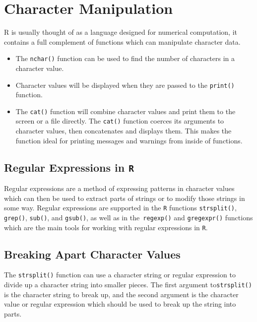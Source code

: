 \section{Character Manipulation}
R is usually thought of as a language designed for numerical computation,
it contains a full complement of functions which can manipulate character
data.

\begin{itemize}
\item The \texttt{nchar()} function can be used to find the number of characters in a character value.
\item Character values will be displayed when they are passed to the  \texttt{print()} function.
\item The \texttt{cat()}  function will combine
character values and print them to the screen or a file directly. The \texttt{cat()}
function coerces its arguments to character values, then concatenates and displays
them. This makes the function ideal for printing messages and warnings
from inside of functions.
\end{itemize}

\subsection{Regular Expressions in \texttt{R}}
Regular expressions are a method of expressing patterns in character values
which can then be used to extract parts of strings or to modify those strings in some way. Regular expressions are supported in the \texttt{R} functions \texttt{strsplit()},
\texttt{grep()}, \texttt{sub()}, and \texttt{gsub()}, as well as in the\texttt{ regexp()} and \texttt{gregexpr()} functions which
are the main tools for working with regular expressions in \texttt{R}.

\subsection{Breaking Apart Character Values}

The \texttt{strsplit()} function can use a character string or regular expression to divide
up a character string into smaller pieces. The first argument to\texttt{strsplit()} 
is the character string to break up, and the second argument is the character
value or regular expression which should be used to break up the string into
parts.
